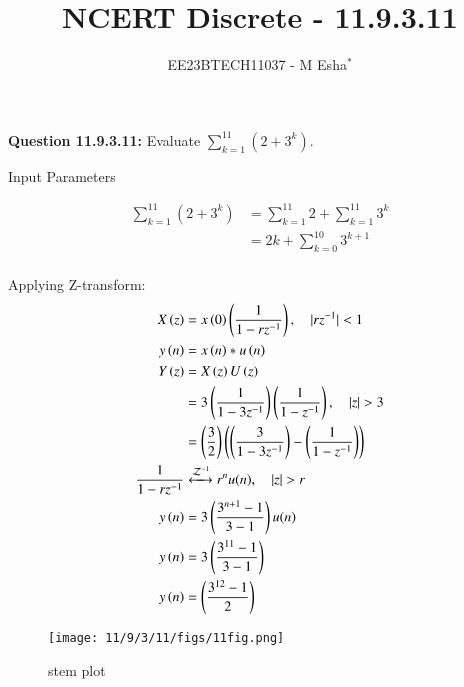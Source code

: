 \documentclass[journal,12pt,twocolumn]{IEEEtran}
\theoremstyle{remark}
\begin{document}

\vspace{3cm}

\title{NCERT Discrete - 11.9.3.11}
\author{EE23BTECH11037 - M Esha$^{*}$}

\maketitle
\newpage
\bigskip

\renewcommand{\thefigure}{\theenumi}
\renewcommand{\thetable}{\theenumi}

\vspace{3cm}
\textbf{Question 11.9.3.11:} 
Evaluate $\sum_{k=1}^{11} (2 + 3^k)$.

\solution
\begin{table}[h!]
  \centering
  
  \caption{Input Parameters}
    \label{tab:table1}
\end{table}

\begin{align}
\sum_{k=1}^{11} (2 + 3^k) &= \sum_{k=1}^{11} 2 + \sum_{k=1}^{11} 3^k \\
&= 2k + \sum_{k=0}^{10}3^{k+1} \\
\end{align}

Applying Z-transform:
\begin{align}
X\brak{z} &= x\brak{0}\brak{\frac{1}{1-rz^{-1}}}, \quad{|rz^{-1}|<1} \\
y\brak{n} &= x\brak{n}*u\brak{n} \\
Y\brak{z} &= X\brak{z}U\brak{z}\\
&=3\brak{\frac{1}{1-3z^{-1}}}\brak{\frac{1}{1-z^{-1}}} ,\quad{|z|>3}\\
&=\brak{\frac{3}{2}}\brak{\brak{\frac{3}{1-3z^{-1}}}-\brak{\frac{1}{1-z^{-1}}}}\\
\frac{1}{1-rz^{-1}} &\xleftrightarrow{\mathcal{Z}^{-1}}  r^nu(n), \quad{|z|>r}\\
y\brak{n} &= 3\brak{\frac{3^{n+1}-1}{3-1}}u(n) \\
y\brak{n} &= 3\brak{\frac{3^{11}-1}{3-1}} \\
y\brak{n} &= \brak{\frac{3^{12}-1}{2}}
\end{align}
\begin{figure}[h!]
    \centering
    \texttt{[image: 11/9/3/11/figs/11fig.png]}
    \caption{stem plot }
    \label{fig:1}
\end{figure}
\end{document}
